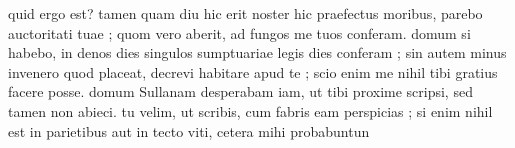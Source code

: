  quid ergo est? tamen quam diu hic erit noster hic praefectus moribus, parebo auctoritati tuae ; quom vero aberit, ad fungos me tuos conferam. domum si habebo, in denos dies singulos sumptuariae legis dies conferam ; sin autem minus invenero quod placeat, decrevi habitare apud te ; scio enim me nihil tibi gratius facere posse. domum Sullanam desperabam iam, ut tibi proxime scripsi, sed tamen non abieci. tu velim, ut scribis, cum fabris eam perspicias ; si enim nihil est in parietibus aut in tecto viti, cetera mihi probabuntun
